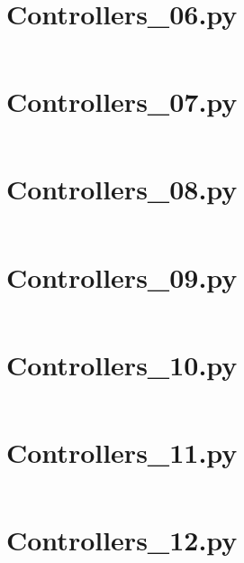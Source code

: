 \pagebreak
\section*{Controllers\_06.py}\label{code:TSatPySamples/Controllers_06.py}\inputminted[linenos,fontsize=\scriptsize]{python}{/home/dcouture/git/mathyourlife/TSatPy/tex/sample_scripts/Controllers_06.py}

\pagebreak
\section*{Controllers\_07.py}\label{code:TSatPySamples/Controllers_07.py}\inputminted[linenos,fontsize=\scriptsize]{python}{/home/dcouture/git/mathyourlife/TSatPy/tex/sample_scripts/Controllers_07.py}

\pagebreak
\section*{Controllers\_08.py}\label{code:TSatPySamples/Controllers_08.py}\inputminted[linenos,fontsize=\scriptsize]{python}{/home/dcouture/git/mathyourlife/TSatPy/tex/sample_scripts/Controllers_08.py}

\pagebreak
\section*{Controllers\_09.py}\label{code:TSatPySamples/Controllers_09.py}\inputminted[linenos,fontsize=\scriptsize]{python}{/home/dcouture/git/mathyourlife/TSatPy/tex/sample_scripts/Controllers_09.py}

\pagebreak
\section*{Controllers\_10.py}\label{code:TSatPySamples/Controllers_10.py}\inputminted[linenos,fontsize=\scriptsize]{python}{/home/dcouture/git/mathyourlife/TSatPy/tex/sample_scripts/Controllers_10.py}

\pagebreak
\section*{Controllers\_11.py}\label{code:TSatPySamples/Controllers_11.py}\inputminted[linenos,fontsize=\scriptsize]{python}{/home/dcouture/git/mathyourlife/TSatPy/tex/sample_scripts/Controllers_11.py}

\pagebreak
\section*{Controllers\_12.py}\label{code:TSatPySamples/Controllers_12.py}\inputminted[linenos,fontsize=\scriptsize]{python}{/home/dcouture/git/mathyourlife/TSatPy/tex/sample_scripts/Controllers_12.py}


